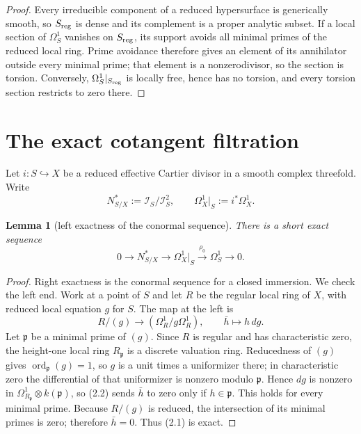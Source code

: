 \documentclass[11pt]{amsart}
\theoremstyle{plain}
\newtheorem{lemma}[theorem]{Lemma}
\theoremstyle{definition}
\theoremstyle{remark}
\begin{document}
\begin{proof}
Every irreducible component of a reduced hypersurface is generically smooth,
so $S_{\rm reg}$ is dense and its complement is a proper analytic subset.
If a local section of $\Omega^1_S$ vanishes on $S_{\rm reg}$, its support avoids
all minimal primes of the reduced local ring.  Prime avoidance therefore gives
an element of its annihilator outside every minimal prime; that element is a
nonzerodivisor, so the section is torsion.  Conversely,
$\Omega^1_S|_{S_{\rm reg}}$ is locally free, hence has no torsion, and every
torsion section restricts to zero there.
\end{proof}

\section{The exact cotangent filtration}

Let $i:S\hookrightarrow X$ be a reduced effective Cartier divisor in a
smooth complex threefold.  Write
\[
 N^*_{S/X}:=\mathcal I_S/\mathcal I_S^2,
 \qquad
 \Omega^1_X|_S:=i^*\Omega^1_X.
\]

\begin{lemma}[left exactness of the conormal sequence]
\label{lem:conormal}
There is a short exact sequence
\[
0\longrightarrow N^*_{S/X}\longrightarrow \Omega^1_X|_S
\xrightarrow{\rho_0}\Omega^1_S\longrightarrow0.
\tag{2.1}
\]
\end{lemma}

\begin{proof}
Right exactness is the conormal sequence for a closed immersion.  We check
the left end.  Work at a point of $S$ and let $R$ be the regular local ring
of $X$, with reduced local equation $g$ for $S$.  The map at the left is
\[
 R/(g)\longrightarrow (\Omega^1_R/g\Omega^1_R),
 \qquad \bar h\longmapsto h\,dg.
 \tag{2.2}
\]
Let $\mathfrak p$ be a minimal prime of $(g)$.  Since $R$ is regular and
has characteristic zero, the height-one local ring $R_{\mathfrak p}$ is a
discrete valuation ring.  Reducedness of $(g)$ gives
$\operatorname{ord}_{\mathfrak p}(g)=1$, so $g$ is a unit times a
uniformizer there; in characteristic zero the differential of that
uniformizer is nonzero modulo $\mathfrak p$.  Hence $dg$ is nonzero in
$\Omega^1_{R_{\mathfrak p}}\otimes k(\mathfrak p)$, so (2.2) sends $\bar h$
to zero only if $h\in\mathfrak p$.  This holds for every minimal prime.
Because $R/(g)$ is reduced, the intersection of its minimal primes is zero;
therefore $\bar h=0$.  Thus (2.1) is exact.
\end{proof}
\end{document}
